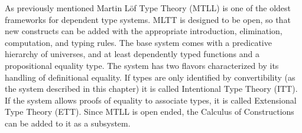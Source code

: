 As previously mentioned Martin L{\"o}f Type Theory (\ac{MTLL})\cite{Martin-Lof-1972} is one of the oldest frameworks for dependent type systems.
MLTT is designed to be open, so that new constructs can be added with the appropriate introduction, elimination, computation, and typing rules.
The base system comes with a predicative hierarchy of universes, and at least dependently typed functions and a propositional equality type.
The system has two flavors characterized by its handling of definitional equality.
If types are only identified by convertibility (as the system described in this chapter) it is called Intentional Type Theory (\ac{ITT}).
If the system allows proofs of equality to associate types, it is called Extensional Type Theory (\ac{ETT}).
Since \ac{MTLL} is open ended, the Calculus of Constructions can be added to it as a subsystem\cite{aspinall2004dependent,hofmann1997extensional}.

